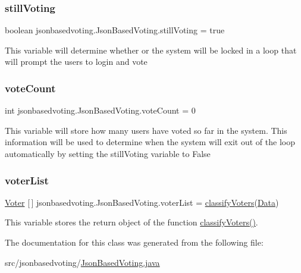\subsubsection{\texorpdfstring{stillVoting}{stillVoting}}
{\footnotesize\ttfamily boolean jsonbasedvoting.\+Json\+Based\+Voting.\+still\+Voting = true\hspace{0.3cm}{\ttfamily [static]}}

This variable will determine whether or the system will be locked in a loop that will prompt the users to login and vote \mbox{\label{classjsonbasedvoting_1_1_json_based_voting_a94c8b3fcebf88d5a739c9bc869160087}} 
\subsubsection{\texorpdfstring{voteCount}{voteCount}}
{\footnotesize\ttfamily int jsonbasedvoting.\+Json\+Based\+Voting.\+vote\+Count = 0\hspace{0.3cm}{\ttfamily [static]}}

This variable will store how many users have voted so far in the system. This information will be used to determine when the system will exit out of the loop automatically by setting the still\+Voting variable to False \mbox{\label{classjsonbasedvoting_1_1_json_based_voting_a50b66e1d5c92322631fc26d0d607172e}} 
\subsubsection{\texorpdfstring{voterList}{voterList}}
{\footnotesize\ttfamily \mbox{\hyperlink{classjsonbasedvoting_1_1_voter}{Voter}} \mbox{[}$\,$\mbox{]} jsonbasedvoting.\+Json\+Based\+Voting.\+voter\+List = \mbox{\hyperlink{classjsonbasedvoting_1_1_json_based_voting_a6f76956192c5ec8d7704c20bcc967d91}{classify\+Voters}}(\mbox{\hyperlink{classjsonbasedvoting_1_1_json_based_voting_a2450ce5604c5512836d2739373c6245e}{Data}})\hspace{0.3cm}{\ttfamily [static]}}

This variable stores the return object of the function \mbox{\hyperlink{classjsonbasedvoting_1_1_json_based_voting_a6f76956192c5ec8d7704c20bcc967d91}{classify\+Voters()}}. 

The documentation for this class was generated from the following file\+:\begin{DoxyCompactItemize}
\item 
src/jsonbasedvoting/\mbox{\hyperlink{_json_based_voting_8java}{Json\+Based\+Voting.\+java}}\end{DoxyCompactItemize}
